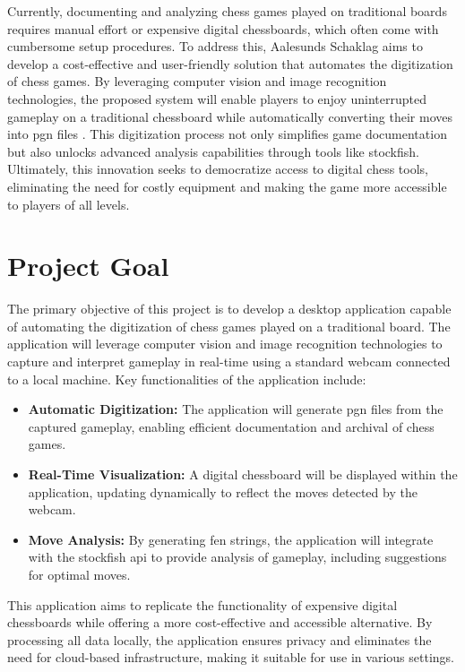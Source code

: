 Currently, documenting and analyzing chess games played on traditional boards requires manual effort or expensive digital chessboards, which often come with cumbersome setup procedures. To address this, Aalesunds Schaklag aims to develop a cost-effective and user-friendly solution that automates the digitization of chess games. By leveraging computer vision and image recognition technologies, the proposed system will enable players to enjoy uninterrupted gameplay on a traditional chessboard while automatically converting their moves into \gls{pgn} files \cite{ntnuopen:21}. This digitization process not only simplifies game documentation but also unlocks advanced analysis capabilities through tools like \gls{stockfish}. Ultimately, this innovation seeks to democratize access to digital chess tools, eliminating the need for costly equipment and making the game more accessible to players of all levels.

\newpage

\section{Project Goal}

The primary objective of this project is to develop a desktop application capable of automating the digitization of chess games played on a traditional board. The application will leverage computer vision and image recognition technologies to capture and interpret gameplay in real-time using a standard webcam connected to a local machine. Key functionalities of the application include:

\begin{itemize}
    \item \textbf{Automatic Digitization:} The application will generate \gls{pgn} files from the captured gameplay, enabling efficient documentation and archival of chess games.

    \item \textbf{Real-Time Visualization:} A digital chessboard will be displayed within the application, updating dynamically to reflect the moves detected by the webcam.

    \item \textbf{Move Analysis:} By generating \gls{fen} strings, the application will integrate with the \gls{stockfish} \gls{api} to provide analysis of gameplay, including suggestions for optimal moves.
\end{itemize}

This application aims to replicate the functionality of expensive digital chessboards while offering a more cost-effective and accessible alternative. By processing all data locally, the application ensures privacy and eliminates the need for cloud-based infrastructure, making it suitable for use in various settings.

